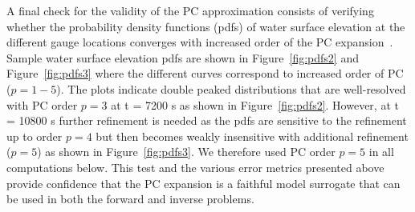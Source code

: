 A final check for the validity of the PC approximation 
consists of verifying whether the probability density
functions (pdfs) of water surface elevation at the different gauge locations
converges with increased order of the PC expansion~\cite{Alexanderian2012,sraj:2013a}.  Sample
water surface elevation pdfs are shown in Figure~\ref{fig:pdfs2}
and Figure~\ref{fig:pdfs3} where
the different curves correspond to increased order of PC ($p= 1-5$).
The plots indicate double peaked distributions that are
well-resolved with PC order $p=3$ at t = 7200 s as shown in Figure~\ref{fig:pdfs2}.
However, at t = 10800 s further refinement is needed as the pdfs are
sensitive to the refinement up to order $p=4$ but then becomes weakly 
insensitive with additional refinement  ($p = 5$) as shown in Figure~\ref{fig:pdfs3}. 
We therefore used PC order $p = 5$ in all computations below.
This test and the various error metrics presented above provide confidence that the PC expansion is a faithful 
model surrogate that can be used in both the forward and inverse problems. 

